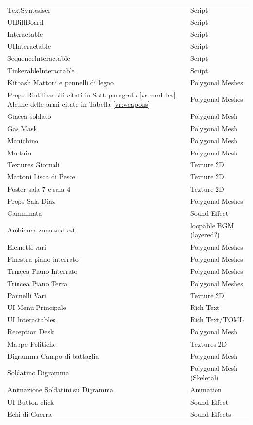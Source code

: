 \documentclass[10pt, openany]{article}
\begin{document}
\begin{longtable}{@{} p{} p{} @{}}
    TextSyntesiser & Script \\
    UIBillBoard & Script \\
    Interactable & Script \\
    UIInteractable & Script \\
    SequenceInteractable & Script \\
    TinkerableInteractable & Script \\
    Kitbash Mattoni e pannelli di legno & Polygonal Meshes \\
    Props Riutilizzabili citati in Sottoparagrafo \ref{vr:modules} Alcune delle armi citate in Tabella \ref{vr:weapons} & Polygonal Meshes \\
    Giacca soldato & Polygonal Mesh \\
    Gas Mask & Polygonal Mesh \\
    Manichino & Polygonal Mesh \\
    Mortaio & Polygonal Mesh \\
    Textures Giornali & Texture 2D \\
    Mattoni Lisca di Pesce & Texture 2D \\
    Poster sala 7 e sala 4 & Texture 2D \\
    Props Sala Diaz & Polygonal Meshes \\
    Camminata & Sound Effect \\
    Ambience zona sud est & loopable BGM (layered?) \\
    Elemetti vari & Polygonal Meshes \\
    Finestra piano interrato & Polygonal Meshes \\
    Trincea Piano Interrato & Polygonal Meshes \\
    Trincea Piano Terra & Polygonal Meshes \\
    Pannelli Vari & Texture 2D \\
    UI Menu Principale & Rich Text \\
    UI Interactables & Rich Text/TOML \\
    Reception Desk & Polygonal Mesh \\
    Mappe Politiche & Textures 2D \\
    Digramma Campo di battaglia & Polygonal Mesh \\
    Soldatino Digramma & Polygonal Mesh (Skeletal) \\
    Animazione Soldatini su Digramma & Animation \\
    UI Button click & Sound Effect \\
    Echi di Guerra & Sound Effects \\
  \end{longtable}
  \renewcommand{\arraystretch}{1}
\end{document}
